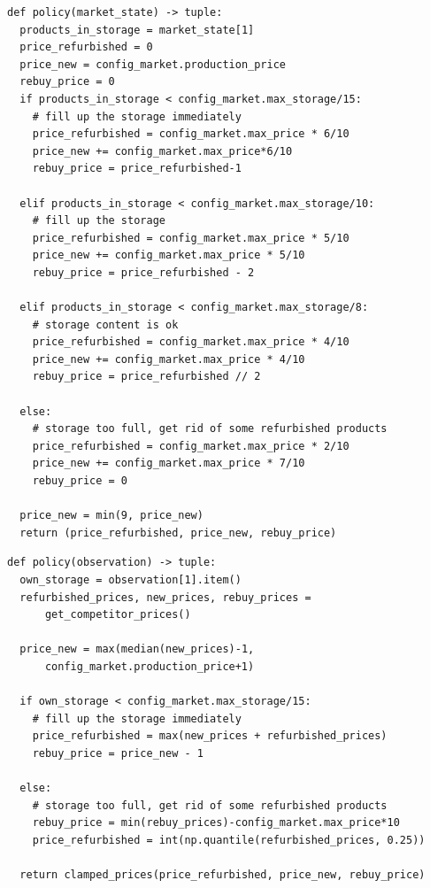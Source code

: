 \newpage

\begin{lstlisting}
def policy(market_state) -> tuple:
  products_in_storage = market_state[1]
  price_refurbished = 0
  price_new = config_market.production_price
  rebuy_price = 0
  if products_in_storage < config_market.max_storage/15:
    # fill up the storage immediately
    price_refurbished = config_market.max_price * 6/10
    price_new += config_market.max_price*6/10
    rebuy_price = price_refurbished-1

  elif products_in_storage < config_market.max_storage/10:
    # fill up the storage
    price_refurbished = config_market.max_price * 5/10
    price_new += config_market.max_price * 5/10
    rebuy_price = price_refurbished - 2

  elif products_in_storage < config_market.max_storage/8:
    # storage content is ok
    price_refurbished = config_market.max_price * 4/10
    price_new += config_market.max_price * 4/10
    rebuy_price = price_refurbished // 2

  else:
    # storage too full, get rid of some refurbished products
    price_refurbished = config_market.max_price * 2/10
    price_new += config_market.max_price * 7/10
    rebuy_price = 0

  price_new = min(9, price_new)
  return (price_refurbished, price_new, rebuy_price)
\end{lstlisting}

\newpage

\begin{lstlisting}
def policy(observation) -> tuple:
  own_storage = observation[1].item()
  refurbished_prices, new_prices, rebuy_prices =
      get_competitor_prices()

  price_new = max(median(new_prices)-1,
      config_market.production_price+1)

  if own_storage < config_market.max_storage/15:
    # fill up the storage immediately
    price_refurbished = max(new_prices + refurbished_prices)
    rebuy_price = price_new - 1

  else:
    # storage too full, get rid of some refurbished products
    rebuy_price = min(rebuy_prices)-config_market.max_price*10
    price_refurbished = int(np.quantile(refurbished_prices, 0.25))

  return clamped_prices(price_refurbished, price_new, rebuy_price)
\end{lstlisting}


